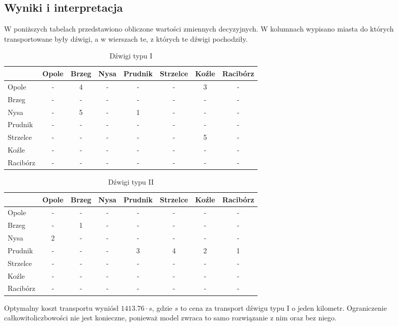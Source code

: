 \documentclass{article}
\begin{document}
\subsection{Wyniki i interpretacja}

W poniższych tabelach przedstawiono obliczone wartości zmiennych decyzyjnych. W kolumnach wypisano miasta do których transportowane były dźwigi, a w wierszach te, z których te dźwigi pochodziły.

\begin{table}[H]
\centering
\begin{tabular}{l|c c c c c c c}
 & Opole & Brzeg & Nysa & Prudnik & Strzelce & Koźle & Racibórz\\\hline
Opole & - & 4 & - & - & - & 3 & -\\\hline
Brzeg & - & - & - & - & - & - & -\\\hline
Nysa & - & 5 & - & 1 & - & - & -\\\hline
Prudnik & - & - & - & - & - & - & -\\\hline
Strzelce & - & - & - & - & - & 5 & -\\\hline
Koźle & - & - & - & - & - & - & -\\\hline
Racibórz & - & - & - & - & - & - & -\\\hline
\end{tabular}
\caption{Dźwigi typu I}
\end{table}

\begin{table}[H]
\centering
\begin{tabular}{l|c c c c c c c}
 & Opole & Brzeg & Nysa & Prudnik & Strzelce & Koźle & Racibórz\\\hline
Opole & - & - & - & - & - & - & -\\\hline
Brzeg & - & 1 & - & - & - & - & -\\\hline
Nysa & 2 & - & - & - & - & - & -\\\hline
Prudnik & - & - & - & 3 & 4 & 2 & 1\\\hline
Strzelce & - & - & - & - & - & - & -\\\hline
Koźle & - & - & - & - & - & - & -\\\hline
Racibórz & - & - & - & - & - & - & -\\\hline
\end{tabular}
\caption{Dźwigi typu II}
\end{table}

Optymalny koszt transportu wyniósł $1413.76 \cdot s$, gdzie $s$ to cena za transport dźwigu typu I o jeden kilometr.
Ograniczenie całkowitoliczbowości nie jest konieczne, ponieważ model zwraca to samo rozwiązanie z nim oraz bez niego.
\end{document}
